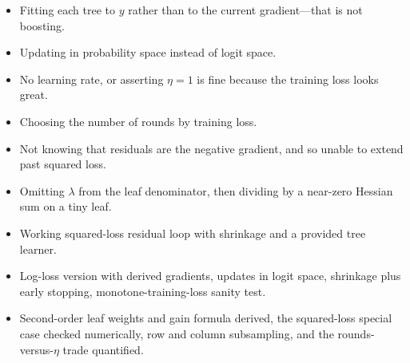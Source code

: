\begin{interviewq}
\redflags
\begin{itemize}
    \item Fitting each tree to $y$ rather than to the current gradient---that is not boosting.
    \item Updating in probability space instead of logit space.
    \item No learning rate, or asserting $\eta = 1$ is fine because the training loss looks great.
    \item Choosing the number of rounds by training loss.
    \item Not knowing that residuals are the negative gradient, and so unable to extend past squared loss.
    \item Omitting $\lambda$ from the leaf denominator, then dividing by a near-zero Hessian sum on a tiny leaf.
\end{itemize}


\goodgreat
\begin{itemize}
    \item {} Working squared-loss residual loop with shrinkage and a provided tree learner.
    \item {} Log-loss version with derived gradients, updates in logit space, shrinkage plus early stopping, monotone-training-loss sanity test.
    \item {} Second-order leaf weights and gain formula derived, the squared-loss special case checked numerically, row and column subsampling, and the rounds-versus-$\eta$ trade quantified.
\end{itemize}

\end{interviewq}

